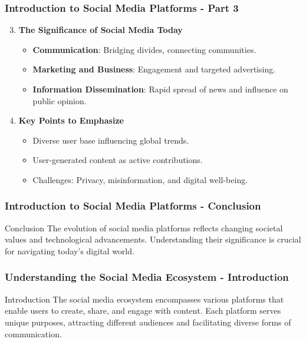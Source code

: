 \documentclass{beamer}
\begin{document}
\begin{frame}[fragile]
    \frametitle{Introduction to Social Media Platforms - Part 3}
    \begin{enumerate}
        \setcounter{enumi}{2}
        \item \textbf{The Significance of Social Media Today}
        \begin{itemize}
            \item \textbf{Communication}: Bridging divides, connecting communities.
            \item \textbf{Marketing and Business}: Engagement and targeted advertising.
            \item \textbf{Information Dissemination}: Rapid spread of news and influence on public opinion.
        \end{itemize}
        \item \textbf{Key Points to Emphasize}
        \begin{itemize}
            \item Diverse user base influencing global trends.
            \item User-generated content as active contributions.
            \item Challenges: Privacy, misinformation, and digital well-being.
        \end{itemize}
    \end{enumerate}
\end{frame}

\begin{frame}[fragile]
    \frametitle{Introduction to Social Media Platforms - Conclusion}
    \begin{block}{Conclusion}
        The evolution of social media platforms reflects changing societal values and technological advancements. 
        Understanding their significance is crucial for navigating today's digital world.
    \end{block}
\end{frame}

\begin{frame}[fragile]
    \frametitle{Understanding the Social Media Ecosystem - Introduction}
    \begin{block}{Introduction}
        The social media ecosystem encompasses various platforms that enable users to create, share, and engage with content. Each platform serves unique purposes, attracting different audiences and facilitating diverse forms of communication.
    \end{block}
\end{frame}
\end{document}
